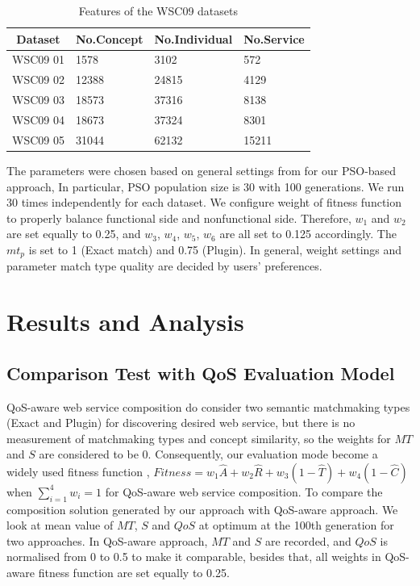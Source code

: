 \documentclass{llncs}
\begin{document}
\begin{table}[]
\centering
\caption{Features of the WSC09 datasets}
\label{wsc09datasetTable}
\begin{tabular}{l|l|l|l}
\hline
\multicolumn{1}{c|}{Dataset} & No.Concept & No.Individual & No.Service \\ \hline
WSC09 01                     & 1578       &3102           &572      \\ \hline
WSC09 02                     & 12388      &24815          &4129      \\ \hline
WSC09 03                     & 18573      &37316          &8138      \\ \hline
WSC09 04                     & 18673      &37324          &8301      \\ \hline
WSC09 05                     & 31044      &62132          &15211    \\ \hline
\end{tabular}
\end{table}

The parameters were chosen based on general settings from \cite{shi2001particle} for our PSO-based approach, In particular, PSO population size is 30 with 100 generations. We run 30 times independently for each dataset. We configure weight of fitness function to properly balance functional side and nonfunctional side. Therefore, $w_{1}$ and $w_{2}$ are set equally to 0.25, and $w_{3}$, $w_{4}$, $w_{5}$, $w_{6}$ are all set to 0.125 accordingly. The $mt_{p}$ is set to 1 (Exact match) and 0.75 (Plugin). In general, weight settings and parameter match type quality are decided by users' preferences.


\section{Results and Analysis}\label{results_analysis}
\subsection{Comparison Test with QoS Evaluation Model}\label{comparisonTest}
QoS-aware web service composition \cite{da2016particle,da2015graphevol,yu2013adaptive,ma2015hybrid} do consider two semantic matchmaking types (Exact and Plugin) for discovering desired web service, but there is no measurement of matchmaking types and concept similarity, so the weights for $MT$ and $S$ are considered to be 0. Consequently, our evaluation mode become a widely used fitness function \cite{ma2015hybrid,da2016particle}, $Fitness = w_1 \hat{A} + w_2 \hat{R} + w_3(1 - \hat{T}) + w_4(1 - \hat{C})$ when $\sum_{i=1}^{4} w_i = 1$  for QoS-aware web service composition. To compare the composition solution generated by our approach with QoS-aware approach. We look at mean value of $MT$, $S$ and $QoS$ at optimum at the 100th generation for two approaches. In QoS-aware approach, $MT$ and $S$ are recorded, and $QoS$ is normalised from 0 to 0.5 to make it comparable, besides that, all weights in QoS-aware fitness function are set equally to 0.25.
\end{document}
